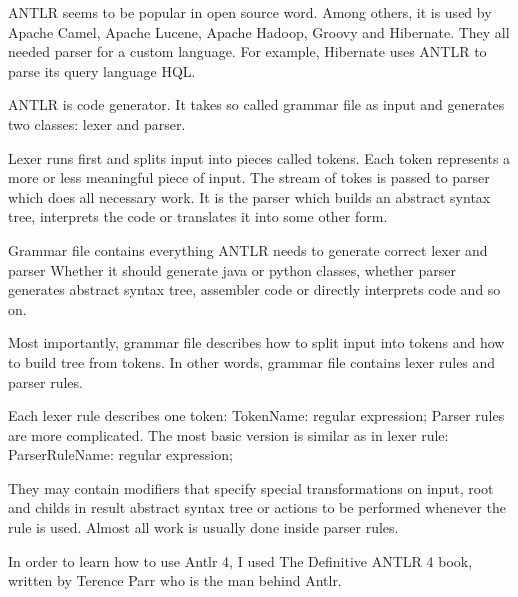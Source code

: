 ANTLR seems to be popular in open source word. Among others, it is used by Apache Camel, Apache Lucene, Apache Hadoop, Groovy and Hibernate. They all needed parser for a custom language. For example, Hibernate uses ANTLR to parse its query language HQL.

ANTLR is code generator. It takes so called grammar file as input and generates two classes: lexer and parser.

Lexer runs first and splits input into pieces called tokens. Each token represents a more or less meaningful piece of input. The stream of tokes is passed to parser which does all necessary work. It is the parser which builds an abstract syntax tree, interprets the code or translates it into some other form.

Grammar file contains everything ANTLR needs to generate correct lexer and parser Whether it should generate java or python classes, whether parser generates abstract syntax tree, assembler code or directly interprets code and so on.

Most importantly, grammar file describes how to split input into tokens and how to build tree from tokens. In other words, grammar file contains lexer rules and parser rules.

Each lexer rule describes one token: TokenName: regular expression; Parser rules are more complicated. The most basic version is similar as in lexer rule: ParserRuleName: regular expression;  

They may contain modifiers that specify special transformations on input, root and childs in result abstract syntax tree or actions to be performed whenever the rule is used. Almost all work is usually done inside parser rules.

In order to learn how to use Antlr 4,  I used The Definitive ANTLR 4 \cite{Terence2012} book, written by Terence Parr who is the man behind Antlr.
